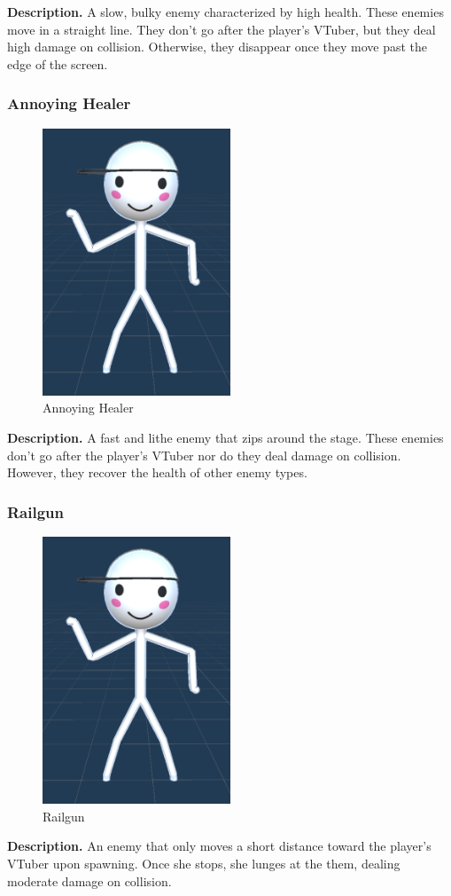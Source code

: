 \documentclass[10pt, a4paper]{article}
\begin{document}
	\textbf{Description.} A slow, bulky enemy characterized by high health. These enemies move in a straight line. They don't go after the player's VTuber, but they deal high damage on collision. Otherwise, they disappear once they move past the edge of the screen.

	\subsubsection{Annoying Healer}

	\begin{figure}[H]
		\centering
		\includegraphics[width=0.5\textwidth]{images/annoying_healer1.png}
		\caption{Annoying Healer}
		\label{fig:annoyinghealer}
	\end{figure}

	\textbf{Description.} A fast and lithe enemy that zips around the stage. These enemies don't go after the player's VTuber nor do they deal damage on collision. However, they recover the health of other enemy types.

	\subsubsection{Railgun}

	\begin{figure}[H]
		\centering
		\includegraphics[width=0.5\textwidth]{images/annoying_healer1.png}
		\caption{Railgun}
		\label{fig:railgun}
	\end{figure}

	\textbf{Description.} An enemy that only moves a short distance toward the player's VTuber upon spawning. Once she stops, she lunges at the them, dealing moderate damage on collision.
\end{document}
